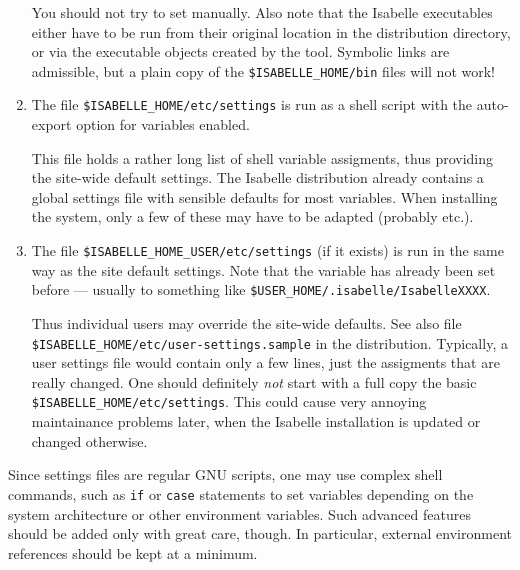 \begin{isabellebody}
\begin{isamarkuptext}
\begin{enumerate}
  You should not try to set \hyperlink{setting.ISABELLE-HOME}{\mbox{}} manually. Also
  note that the Isabelle executables either have to be run from their
  original location in the distribution directory, or via the
  executable objects created by the \hyperlink{tool.install}{\mbox{}} tool.  Symbolic
  links are admissible, but a plain copy of the \verb|$ISABELLE_HOME/bin| files will not work!

  \item The file \verb|$ISABELLE_HOME/etc/settings| is run as a
  \hyperlink{executable.bash}{\mbox{}} shell script with the auto-export option for
  variables enabled.
  
  This file holds a rather long list of shell variable assigments,
  thus providing the site-wide default settings.  The Isabelle
  distribution already contains a global settings file with sensible
  defaults for most variables.  When installing the system, only a few
  of these may have to be adapted (probably \hyperlink{setting.ML-SYSTEM}{\mbox{}}
  etc.).
  
  \item The file \verb|$ISABELLE_HOME_USER/etc/settings| (if it
  exists) is run in the same way as the site default settings. Note
  that the variable \hyperlink{setting.ISABELLE-HOME-USER}{\mbox{}} has already been set
  before --- usually to something like \verb|$USER_HOME/.isabelle/IsabelleXXXX|.
  
  Thus individual users may override the site-wide defaults.  See also
  file \verb|$ISABELLE_HOME/etc/user-settings.sample| in the
  distribution.  Typically, a user settings file would contain only a
  few lines, just the assigments that are really changed.  One should
  definitely \emph{not} start with a full copy the basic \verb|$ISABELLE_HOME/etc/settings|. This could cause very annoying
  maintainance problems later, when the Isabelle installation is
  updated or changed otherwise.
  
  \end{enumerate}

  Since settings files are regular GNU \hypertarget{executable.bash}{\hyperlink{executable.bash}{\mbox{}}} scripts,
  one may use complex shell commands, such as \verb|if| or
  \verb|case| statements to set variables depending on the
  system architecture or other environment variables.  Such advanced
  features should be added only with great care, though. In
  particular, external environment references should be kept at a
  minimum.


\end{isamarkuptext}
\end{isabellebody}
